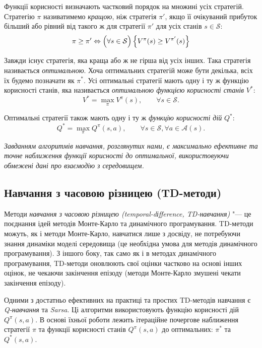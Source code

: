 \documentclass[a4paper,10pt,fleqn]{article}
\begin{document}
Функції корисності визначають частковий порядок на множині усіх стратегій. Стратегію $\pi$ називатимемо \emph{кращою}, ніж стратегія $\pi '$, якщо її очікуваний прибуток більший або рівний від такого ж для стратегії $\pi '$ для усіх станів $s \in \mathcal{S}$:
\begin{equation}
\pi \geq \pi ' \Leftrightarrow \Bigl(\forall s \in \mathcal{S}\Bigr)\left\{ V^\pi(s) \geq V^{\pi '}(s) \right\}
\end{equation}

Завжди існує стратегія, яка краща або ж не гірша від усіх інших. Така стратегія називається \emph{оптимальною}. Хоча оптимальних стратегій може бути декілька, всіх їх будемо позначати як $\pi^*$. Усі оптимальні стратегії мають одну і ту ж функцію корисності станів, яка називається \emph{оптимальною функцією корисності станів} $V^*$:
\begin{equation}
V^* = \max_\pi V^\pi(s),\qquad \forall s \in \mathcal{S}.
\end{equation}

Оптимальні стратегії також мають одну і ту ж \emph{функцію корисності дій} $Q^*$:
\begin{equation}
Q^* = \max_\pi Q^\pi(s,a),\qquad \forall s \in \mathcal{S}, \forall a \in \mathcal{A}(s).
\end{equation}

\textit{Завданням алгоритмів навчання, розглянутих нами, є максимально ефективне та точне наближення функції корисності до оптимальної, використовуючи обмежені дані про взаємодію з середовищем.}

\subsection{Навчання з часовою різницею (TD-методи)}

Методи \emph{навчання з часовою різницею (temporal-dіfference, TD-навчання)} "--- це поєднання ідей методів Монте-Карло та динамічного програмування. TD-методи можуть, як і методи Монте-Карло, навчатися лише з досвіду, не потребуючи знання динаміки моделі середовища (це необхідна умова для методів динамічного програмування). З іншого боку, так само як і в методах динамічного програмування, TD-методи оновлюють свої оцінки частково на основі інших оцінок, не чекаючи закінчення епізоду (методи Монте-Карло змушені чекати закінчення епізоду).

Одними з достатньо ефективних на практиці та простих TD-методів навчання є \emph{Q-навчання} та \emph{Sarsa}. Ці алгоритми використовують функцію корисності дій $Q^\pi(s,a)$. В основі їхньої роботи лежить ітераційне почергове наближення стратегії $\pi$ та функції корисності станів $Q^\pi(s,a)$ до оптимальних: $\pi^*$ та $Q^*(s,a)$.
\end{document}
